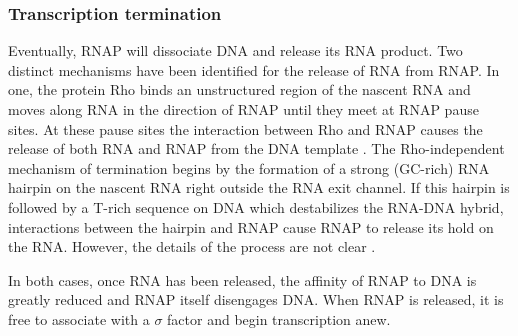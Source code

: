 \subsubsection{Transcription termination}
Eventually, RNAP will dissociate DNA and release its RNA product. Two distinct
mechanisms have been identified for the release of RNA from RNAP. In one, the
protein Rho binds an unstructured region of the nascent RNA and moves along RNA
in the direction of RNAP until they meet at RNAP pause sites. At these pause
sites the interaction between Rho and RNAP causes the release of both RNA and
RNAP from the DNA template \cite{ciampi_rho-dependent_2006}. The
Rho-independent mechanism of termination begins by the formation of a strong
(GC-rich) RNA hairpin on the nascent RNA right outside the RNA exit channel. If
this hairpin is followed by a T-rich sequence on DNA which destabilizes the
RNA-DNA hybrid, interactions between the hairpin and RNAP cause RNAP to release
its hold on the RNA. However, the details of the process are not clear
\cite{nudler_transcription_2002}.

In both cases, once RNA has been released, the affinity of RNAP to DNA is
greatly reduced and RNAP itself disengages DNA. When RNAP is released, it is
free to associate with a $\sigma$ factor and begin transcription anew.
